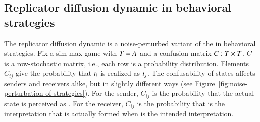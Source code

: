 \documentclass[fleqn,reqno,10pt]{article}
\newcommand{\rd}{\acro{rd}} %
\begin{document}
\subsection{Replicator diffusion dynamic in behavioral strategies}
\label{sec:repl-diff-dynam-1}

The replicator diffusion dynamic is a noise-perturbed variant of the
\rd in behavioral strategies. Fix a sim-max game with $T =
A$ and a confusion matrix $C : T \times T$. $C$ is a
row-stochastic matrix, i.e., each row is a probability
distribution. Elements $C_{ij}$ give the probability that $t_i$
is realized as $t_j$. The confusability of states affects senders
and receivers alike, but in slightly different ways (see
Figure~\ref{fig:noise-perturbation-of-strategies}). For the sender,
$C_{ij}$ is the probability that the actual state  is
perceived as . For the receiver, $C_{ij}$ is the
probability that  is the interpretation that is actually
formed when  is the intended interpretation.
\end{document}
